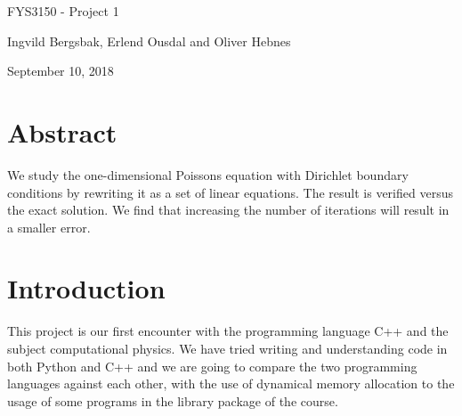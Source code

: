 \documentclass[%
oneside,                 %
final,                   %
10pt]{article}
\begin{document}



\newcommand{\exercisesection}[1]{\subsection*{#1}}






\thispagestyle{empty}

\begin{center}
{\LARGE\bf
\begin{spacing}{1.25}
FYS3150 - Project 1
\end{spacing}
}
\end{center}



\begin{center}
\centerline{{\small Ingvild Bergsbak, Erlend Ousdal and Oliver Hebnes}}
\end{center}



\begin{center}
September 10, 2018
\end{center}

\vspace{1cm}

\newpage{}


\section{Abstract}

We study the one-dimensional Poissons equation with Dirichlet boundary conditions by rewriting it as a set of linear equations.
The result is verified versus the exact solution. We find that increasing the number of iterations
will result in a smaller error.

\section{Introduction}

This project is our first encounter with the programming language C++ and the subject computational physics.
We have tried writing and understanding code in both Python and C++ and we are going to compare the two programming languages against each other, with
the use of dynamical memory allocation to the usage of some programs in the library package of the course.
\end{document}
